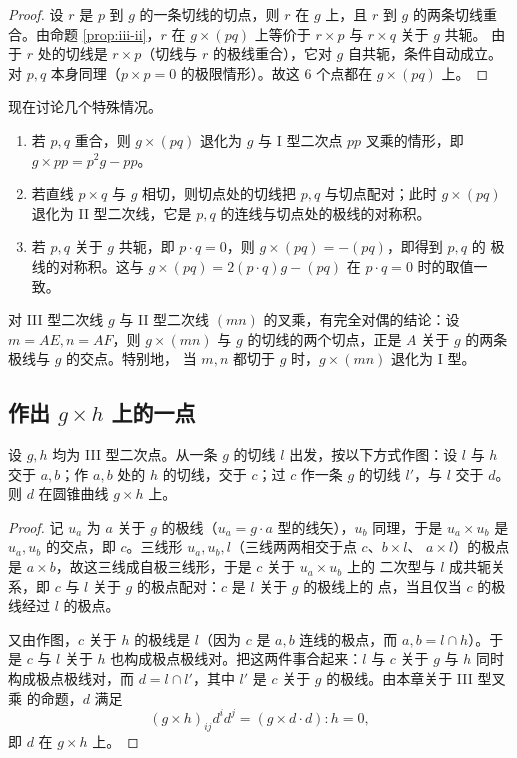\begin{proof}
设 $r$ 是 $p$ 到 $g$ 的一条切线的切点，则 $r$ 在 $g$ 上，且 $r$ 到 $g$ 的两条切线重合。由命题
\ref{prop:iii-ii}，$r$ 在 $g\times(pq)$ 上等价于 $r\times p$ 与 $r\times q$ 关于 $g$ 共轭。
由于 $r$ 处的切线是 $r\times p$（切线与 $r$ 的极线重合），它对 $g$ 自共轭，条件自动成立。对
$p,q$ 本身同理（$p\times p=0$ 的极限情形）。故这 $6$ 个点都在 $g\times(pq)$ 上。
\end{proof}

现在讨论几个特殊情况。

\begin{enumerate}[label=(\arabic*),leftmargin=2.2em]
  \item 若 $p,q$ 重合，则 $g\times(pq)$ 退化为 $g$ 与 I 型二次点 $pp$ 叉乘的情形，即
        $g\times pp=p^2g-pp$。
  \item 若直线 $p\times q$ 与 $g$ 相切，则切点处的切线把 $p,q$ 与切点配对；此时
        $g\times(pq)$ 退化为 II 型二次线，它是 $p,q$ 的连线与切点处的极线的对称积。
  \item 若 $p,q$ 关于 $g$ 共轭，即 $p\cdot q=0$，则 $g\times(pq)=-(pq)$，即得到 $p,q$ 的
        极线的对称积。这与 $g\times(pq)=2(p\cdot q)g-(pq)$ 在 $p\cdot q=0$ 时的取值一致。
\end{enumerate}

对 III 型二次线 $g$ 与 II 型二次线 $(mn)$ 的叉乘，有完全对偶的结论：设 $m=AE,n=AF$，则
$g\times(mn)$ 与 $g$ 的切线的两个切点，正是 $A$ 关于 $g$ 的两条极线与 $g$ 的交点。特别地，
当 $m,n$ 都切于 $g$ 时，$g\times(mn)$ 退化为 I 型。

\subsection{作出 $g\times h$ 上的一点}

\begin{proposition}
设 $g,h$ 均为 III 型二次点。从一条 $g$ 的切线 $l$ 出发，按以下方式作图：设 $l$ 与 $h$ 交于
$a,b$；作 $a,b$ 处的 $h$ 的切线，交于 $c$；过 $c$ 作一条 $g$ 的切线 $l'$，与 $l$ 交于 $d$。
则 $d$ 在圆锥曲线 $g\times h$ 上。
\end{proposition}

\begin{proof}
记 $u_a$ 为 $a$ 关于 $g$ 的极线（$u_a=g\cdot a$ 型的线矢），$u_b$ 同理，于是 $u_a\times u_b$ 是
$u_a,u_b$ 的交点，即 $c$。三线形 $u_a,u_b,l$（三线两两相交于点 $c$、$b\times l$、
$a\times l$）的极点是 $a\times b$，故这三线成自极三线形，于是 $c$ 关于 $u_a\times u_b$ 上的
二次型与 $l$ 成共轭关系，即 $c$ 与 $l$ 关于 $g$ 的极点配对：$c$ 是 $l$ 关于 $g$ 的极线上的
点，当且仅当 $c$ 的极线经过 $l$ 的极点。

又由作图，$c$ 关于 $h$ 的极线是 $l$（因为 $c$ 是 $a,b$ 连线的极点，而 $a,b=l\cap h$）。于是
$c$ 与 $l$ 关于 $h$ 也构成极点极线对。把这两件事合起来：$l$ 与 $c$ 关于 $g$ 与 $h$ 同时
构成极点极线对，而 $d=l\cap l'$，其中 $l'$ 是 $c$ 关于 $g$ 的极线。由本章关于 III 型叉乘
的命题，$d$ 满足
\[
(g\times h)_{ij}d^id^j=(g\times d\cdot d):h=0 ,
\]
即 $d$ 在 $g\times h$ 上。
\end{proof}

